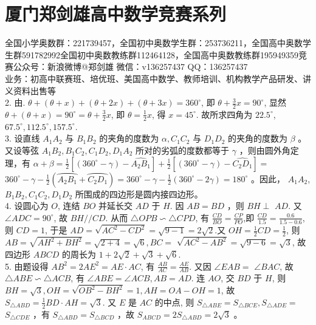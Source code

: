\documentclass[10pt]{article}
\begin{document}
\section*{厦门郑剑雄高中数学竞赛系列}
全国小学奥数群：221739457，全国初中奥数学生群：253736211，全国高中奥数学生群591782992全国初中奥数教练群112464128，全国高中奥数教练群195949359竞赛公众号：新浪微博@郑剑雄 微信：v136257437 QQ：136257437\\
业务：初高中联赛班、培优班、美国高中数学、教师培训、机构教学产品研发、讲义资料出售等\\
2. 由. $\theta+(\theta+x)+(\theta+2 x)+(\theta+3 x)=360^{\circ}$, 即 $\theta+\frac{3}{2} x=90^{\circ}$, 显然 $\theta+(\theta+x)=90^{\circ}=\theta+\frac{3}{2} x$, 即 $\theta=\frac{1}{2} x$, 得 $x=45^{\circ}$. 故所求四角为 $22.5^{\circ}$, $67.5^{\circ}, 112.5^{\circ}, 157.5^{\circ}$.\\
3. 设直线 $A_{1} A_{2}$ 与 $B_{1} B_{2}$ 的夹角的度数为 $\alpha, C_{1} C_{2}$ 与 $D_{1} D_{2}$ 的夹角的度数为 $\beta$ 。又设等弦 $A_{1} B_{2}, B_{1} C_{2}, C_{1} D_{2}, D_{1} A_{2}$ 所对的劣弧的度数都等于 $\gamma$ ，则由圆外角定理，有 $\alpha+\beta=\frac{1}{2}\left[\left(360^{\circ}-\gamma\right)-\widehat{A_{2} B_{1}}\right]+\frac{1}{2}\left[\left(360^{\circ}-\gamma\right)-\widehat{C_{2} D_{1}}\right]=$ $360^{\circ}-\gamma-\frac{1}{2}\left(\overparen{A_{2} B_{1}}+\overparen{C_{2} D_{1}}\right)=360^{\circ}-\gamma-\frac{1}{2}\left(360^{\circ}-2 \gamma\right)=180^{\circ}$ 。因此， $A_{1} A_{2}$, $B_{1} B_{2}, C_{1} C_{2}, D_{1} D_{2}$ 所围成的四边形是圆内接四边形。\\
4. 设圆心为 $O$, 连结 $B O$ 并延长交 $A D$ 于 $H$. 因 $A B=B D$ ，则 $B H \perp$ $A D$. 又 $\angle A D C=90^{\circ}$, 故 $B H / / C D$. 从而 $\triangle O P B \backsim \triangle C P D$, 有 $\frac{C D}{B O}=\frac{C P}{P O}$,即 $\frac{C D}{1.5}=\frac{0.6}{1.5-0.6}$, 则 $C D=1$, 于是 $A D=\sqrt{A C^{2}-C D^{2}}=\sqrt{9-1}=2 \sqrt{2}$.又 $O H=\frac{1}{2} C D=\frac{1}{2}$, 则 $A B=\sqrt{A H^{2}+B H^{2}}=\sqrt{2+4}=\sqrt{6}, B C=$ $\sqrt{A C^{2}-A B^{2}}=\sqrt{9-6}=\sqrt{3}$, 故四边形 $A B C D$ 的周长为 $1+2 \sqrt{2}+\sqrt{3}+\sqrt{6}$.\\
5. 由题设得 $A B^{2}=2 A E^{2}=A E \cdot A C$, 有 $\frac{A B}{A C}=\frac{A E}{A B}$. 又因 $\angle E A B=$ $\angle B A C$, 故 $\triangle A B E \backsim \triangle A C B$, 有 $\angle A B E=\angle A C B, A B=A D$. 连 $A O$, 交 $B D$ 于 $H$, 则 $B H=\sqrt{3}, O H=\sqrt{O B^{2}-B H^{2}}=1, A H=O A-O H=1$, 故 $S_{\triangle A B D}=\frac{1}{2} B D \cdot A H=\sqrt{3}$. 又 $E$ 是 $A C$ 的中点, 则 $S_{\triangle A B E}=S_{\triangle B C E}, S_{\triangle A D E}=$ $S_{\triangle C D E}$ ，有 $S_{\triangle A B D}=S_{\triangle B C D}$ ，故 $S_{A B C D}=2 S_{\triangle A B D}=2 \sqrt{3}$ 。\\
\end{document}
